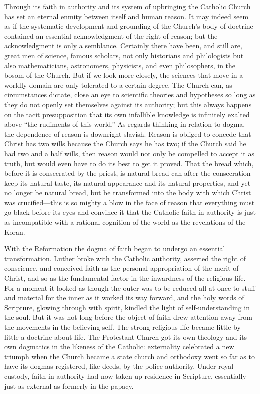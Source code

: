 \documentclass[12pt,a4paper,openany]{book}
\newcommand{\opage}[1]{\marginnote{\footnotesize\textit{[#1]}}}
\begin{document}
Through its faith in authority and its system of upbringing the Catholic
Church has set an eternal enmity between itself and human reason. It may
indeed seem \opage{24}as if the systematic development and grounding of the
Church's body of doctrine contained an essential acknowledgment of the
right of reason; but the acknowledgment is only a semblance. Certainly
there have been, and still are, great men of science, famous scholars,
not only historians and philologists but also mathematicians,
astronomers, physicists, and even philosophers, in the bosom of the
Church. But if we look more closely, the sciences that move in a worldly
domain are only tolerated to a certain degree. The Church can, as
circumstances dictate, close an eye to scientific theories and
hypotheses so long as they do not openly set themselves against its
authority; but this always happens on the tacit presupposition that its
own infallible knowledge is infinitely exalted above ``the rudiments of
this world.'' As regards thinking in relation to dogma, the dependence of
reason is downright slavish. Reason is obliged to concede that Christ has
two wills because the Church says he has two; if the Church said he had
two and a half wills, %
then reason would not only be compelled to accept it as truth, but would
even have to do its best to get it proved. That the bread which, before
it is consecrated by the priest, is natural bread can after the
consecration keep its natural taste, its natural appearance and its
natural properties, and yet no longer be natural bread, but be
transformed into the body with which Christ was crucified---this is so
mighty a blow in the face of reason that everything must go black before
its eyes and convince it that the Catholic faith in authority is just as
incompatible with a rational cognition of the world as the revelations
of the Koran.

\opage{25}With the Reformation the dogma of faith began to undergo an essential
transformation. Luther broke with the Catholic authority, asserted the
right of conscience, and conceived faith as the personal appropriation of
the merit of Christ, and so as the fundamental factor in the inwardness
of the religious life. For a moment it looked as though the outer was to
be reduced all at once to stuff and material for the inner as it worked
its way forward, and the holy words of Scripture, glowing through with
spirit, kindled the light of self-understanding in the soul. But it was
not long before the object of faith drew attention away from the
movements in the believing self. The strong religious life became little
by little a doctrine about life. The Protestant Church got its own
theology and its own dogmatics in the likeness of the Catholic:
externality celebrated a new triumph when the Church became a state
church and orthodoxy went so far as to have its dogmas registered, like
deeds, by the police authority. Under royal custody, faith in authority
had now taken up residence in Scripture, essentially just as external as
formerly in the papacy.
\end{document}
